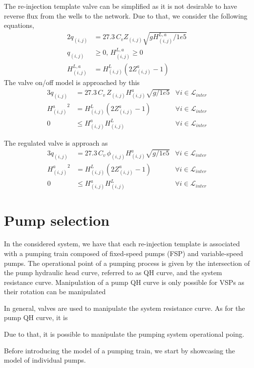 The re-injection template valve can be simplified as it is not desirable to have reverse flux from the wells to the network. Due to that, we consider the following equations,
\begin{alignat}{2}
    q_{(i,j)} &= 27.3 \, C_v Z_{(i,j)} \sqrt{g H^{L,a}_{(i,j)}/1e5}
    \\
    q_{(i,j)} &\geq 0, \, H^{L,a}_{(i,j)} \geq 0
    \\
    H^{L,a}_{(i,j)} &= H^{L}_{(i,j)}(2Z^a_{(i,j)} -1)
\end{alignat}
The valve on/off model is approached by this
\begin{alignat}{3}
    q_{(i,j)} &= 27.3\,C_v\,Z_{(i,j)}H_{(i,j)}^a\sqrt{g/1e5} & \forall i \in \mathcal{L}_{inter}
    \\
    {H_{(i,j)}^a}^2 &= H^{L}_{(i,j)}(2 Z^{a}_{(i,j)} -1) & \forall i \in \mathcal{L}_{inter}
    \\
    0 & \leq H_{(i,j)}^a H_{(i,j)}^L & \forall i \in \mathcal{L}_{inter}
\end{alignat}

The regulated valve is approach as
\begin{alignat}{3}
    q_{(i,j)} &= 27.3\,C_v\,\phi_{(i,j)}H_{(i,j)}^a\sqrt{g/1e5} & \forall i \in \mathcal{L}_{inter}
    \\
    {H_{(i,j)}^a}^2 &= H^{L}_{(i,j)}(2 Z^{a}_{(i,j)} -1) & \forall i \in \mathcal{L}_{inter}
    \\
    0 & \leq H_{(i,j)}^a H_{(i,j)}^L & \forall i \in \mathcal{L}_{inter}
\end{alignat}


\section{Pump selection}
In the considered system, we have that each re-injection template is associated with a pumping train composed of fixed-speed pumps (FSP) and variable-speed pumps. The operational point of a pumping process is given by the intersection of the pump hydraulic head curve, referred to as QH curve, and the system resistance curve. Manipulation of a pump QH curve is only possible for VSPs as their rotation can be manipulated 

In general, valves are used to manipulate the system resistance curve. As for the pump QH curve, it is 

Due to that, it is possible to manipulate the pumping system operational poing.


Before introducing the model of a pumping train, we start by showcasing the model of individual pumps.  

